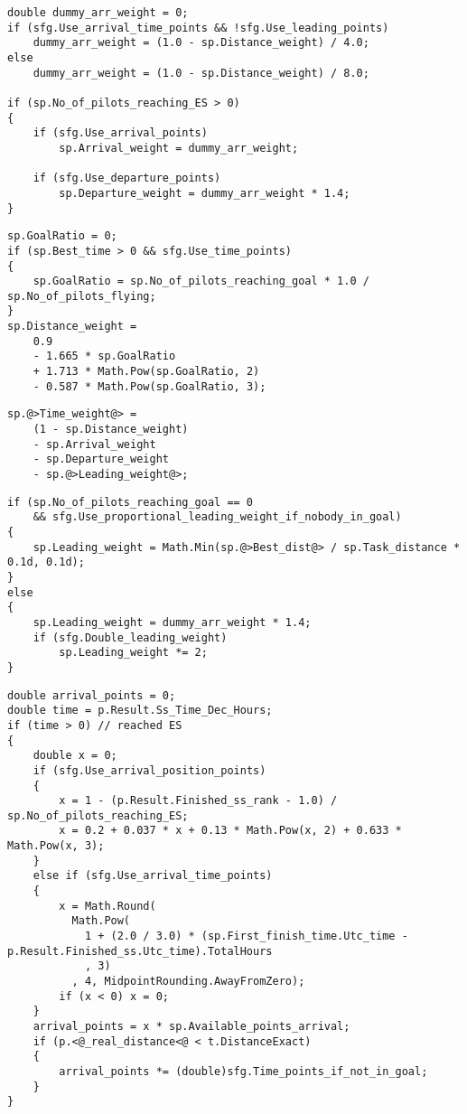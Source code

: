 \documentclass[gap.tex]{subfiles}
\begin{document}
\pagebreak

\begin{lstlisting}[style=base, caption={Arrival weight and departure weight don't depend on distance inputs.}]
double dummy_arr_weight = 0;
if (sfg.Use_arrival_time_points && !sfg.Use_leading_points)
    dummy_arr_weight = (1.0 - sp.Distance_weight) / 4.0;
else
    dummy_arr_weight = (1.0 - sp.Distance_weight) / 8.0;

if (sp.No_of_pilots_reaching_ES > 0)
{
    if (sfg.Use_arrival_points)
        sp.Arrival_weight = dummy_arr_weight;

    if (sfg.Use_departure_points)
        sp.Departure_weight = dummy_arr_weight * 1.4;
}
\end{lstlisting}

\begin{lstlisting}[style=base, caption={Distance weight doesn't depend on distance inputs.}]
sp.GoalRatio = 0;
if (sp.Best_time > 0 && sfg.Use_time_points)
{
    sp.GoalRatio = sp.No_of_pilots_reaching_goal * 1.0 / sp.No_of_pilots_flying;
}
sp.Distance_weight =
    0.9
    - 1.665 * sp.GoalRatio
    + 1.713 * Math.Pow(sp.GoalRatio, 2)
    - 0.587 * Math.Pow(sp.GoalRatio, 3);
\end{lstlisting}

\begin{lstlisting}[style=base, caption={Time weight depends on \textcolor{red}{bonus} distance through leading weight.}]
sp.@>Time_weight@> =
    (1 - sp.Distance_weight)
    - sp.Arrival_weight
    - sp.Departure_weight
    - sp.@>Leading_weight@>;
\end{lstlisting}

\begin{lstlisting}[style=base, caption={Leading weight depends on \textcolor{red}{bonus} distance.}]
if (sp.No_of_pilots_reaching_goal == 0
    && sfg.Use_proportional_leading_weight_if_nobody_in_goal)
{
    sp.Leading_weight = Math.Min(sp.@>Best_dist@> / sp.Task_distance * 0.1d, 0.1d);
}
else
{
    sp.Leading_weight = dummy_arr_weight * 1.4;
    if (sfg.Double_leading_weight)
        sp.Leading_weight *= 2;
}
\end{lstlisting}

\pagebreak

\begin{lstlisting}[style=base, caption={Arrival point allocation depends on \textcolor{blue}{real} distance.}]
double arrival_points = 0;
double time = p.Result.Ss_Time_Dec_Hours;
if (time > 0) // reached ES
{
    double x = 0;
    if (sfg.Use_arrival_position_points)
    {
        x = 1 - (p.Result.Finished_ss_rank - 1.0) / sp.No_of_pilots_reaching_ES;
        x = 0.2 + 0.037 * x + 0.13 * Math.Pow(x, 2) + 0.633 * Math.Pow(x, 3);
    }
    else if (sfg.Use_arrival_time_points)
    {
        x = Math.Round(
          Math.Pow(
            1 + (2.0 / 3.0) * (sp.First_finish_time.Utc_time - p.Result.Finished_ss.Utc_time).TotalHours
            , 3)
          , 4, MidpointRounding.AwayFromZero);
        if (x < 0) x = 0;
    }
    arrival_points = x * sp.Available_points_arrival;
    if (p.<@_real_distance<@ < t.DistanceExact)
    {
        arrival_points *= (double)sfg.Time_points_if_not_in_goal;
    }
}
\end{lstlisting}
\end{document}
